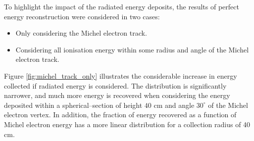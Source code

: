 \noindent
To highlight the impact of the radiated energy deposits, the results of perfect
energy reconstruction were considered in two cases:
\begin{itemize}
	\item Only considering the Michel electron track.
	\item Considering all ionisation energy within some radius and angle of the
		Michel electron track.
\end{itemize}
Figure \ref{fig:michel_track_only} illustrates the considerable increase in
energy collected if radiated energy is considered. The distribution is
significantly narrower, and much more energy is recovered when considering the
energy deposited within a spherical--section of height $40\mbox{ cm}$ and angle
$30^\circ$ of the Michel electron vertex. In addition, the fraction of energy
recovered as a function of Michel electron energy has a more linear
distribution for a collection radius of 40 cm.
